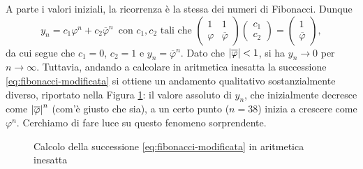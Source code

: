 A parte i valori iniziali, la ricorrenza è la stessa
dei numeri di Fibonacci. Dunque
\[
y_n = c_1 \varphi^n + c_2 \overline{\varphi}^n
\, \text{ con $c_1,c_2$ tali che }
\begin{pmatrix}
1 & 1 \\
\varphi & \overline{\varphi}
\end{pmatrix}
\begin{pmatrix} c_1 \\ c_2 \end{pmatrix}
= \begin{pmatrix} 1 \\ \overline{\varphi} \end{pmatrix},
\]
da cui segue che $c_1 = 0$, $c_2 = 1$ e $y_n = \overline{\varphi}^n$.
Dato che $\left\lvert\overline{\varphi}\right\rvert < 1$, si ha $y_n \to 0$ per $n \to \infty$.
Tuttavia, andando a calcolare in aritmetica inesatta la successione
\eqref{eq:fibonacci-modificata} si ottiene un andamento qualitativo
sostanzialmente diverso, riportato nella Figura \ref{fig:bitfatale}:
il valore assoluto di $y_n$, che inizialmente decresce come
$\left\lvert\overline{\varphi}\right\rvert^n$ (com'è giusto che sia),
a un certo punto ($n = 38$) inizia a crescere come $\varphi^n$.
Cerchiamo di fare luce su questo fenomeno sorprendente.

\begin{figure}[tp]
\centering
{}
\caption{Calcolo della successione \eqref{eq:fibonacci-modificata}
in aritmetica inesatta}
\label{fig:bitfatale}
\end{figure}

